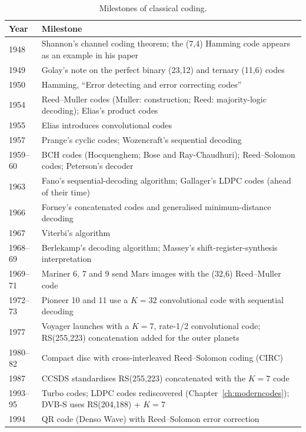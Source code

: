 \begin{table}[htbp]\centering\small
\caption{Milestones of classical coding.}
\label{tab:ch14:timeline}
\begin{tabularx}{\linewidth}{@{}l X@{}}
\toprule
Year & Milestone\\
\midrule
1948 & Shannon's channel coding theorem; the (7,4) Hamming code appears as an example in his paper\\
1949 & Golay's note on the perfect binary (23,12) and ternary (11,6) codes\\
1950 & Hamming, ``Error detecting and error correcting codes''\\
1954 & Reed--Muller codes (Muller: construction; Reed: majority-logic decoding); Elias's product codes\\
1955 & Elias introduces convolutional codes\\
1957 & Prange's cyclic codes; Wozencraft's sequential decoding\\
1959--60 & BCH codes (Hocquenghem; Bose and Ray-Chaudhuri); Reed--Solomon codes; Peterson's decoder\\
1963 & Fano's sequential-decoding algorithm; Gallager's LDPC codes (ahead of their time)\\
1966 & Forney's concatenated codes and generalised minimum-distance decoding\\
1967 & Viterbi's algorithm\\
1968--69 & Berlekamp's decoding algorithm; Massey's shift-register-synthesis interpretation\\
1969--71 & Mariner 6, 7 and 9 send Mars images with the (32,6) Reed--Muller code\\
1972--73 & Pioneer 10 and 11 use a $K=32$ convolutional code with sequential decoding\\
1977 & Voyager launches with a $K=7$, rate-1/2 convolutional code; RS(255,223) concatenation added for the outer planets\\
1980--82 & Compact disc with cross-interleaved Reed--Solomon coding (CIRC)\\
1987 & CCSDS standardises RS(255,223) concatenated with the $K=7$ code\\
1993--95 & Turbo codes; LDPC codes rediscovered (Chapter~\ref{ch:moderncodes}); DVB-S uses RS(204,188) + $K=7$\\
1994 & QR code (Denso Wave) with Reed--Solomon error correction\\
\bottomrule
\end{tabularx}
\end{table}

